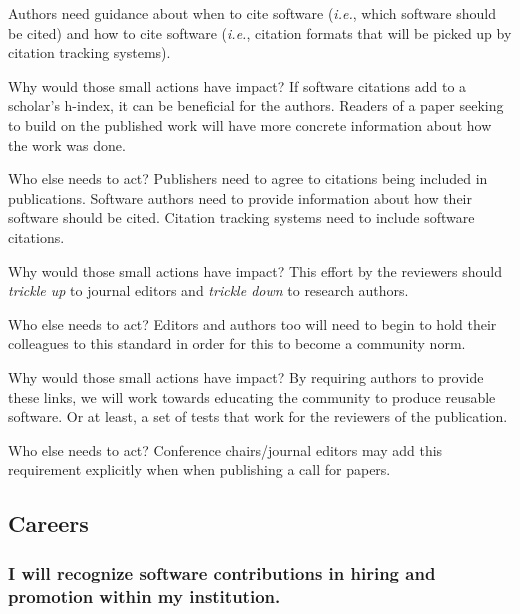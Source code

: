 \documentclass[a4paper,UKenglish]{dagman}
\renewcommand{\paragraph}[1]{\subsubsection*{#1}\xspace}
\newcommand{\ie}{\emph{i.e.},\xspace}
\newcommand{\etc}{\emph{etc.}\xspace}
\begin{document}
Authors need guidance about when to cite software (\ie which software should be cited) and how to cite software (\ie citation formats that will be picked up by citation tracking systems). 

Why would those small actions have impact? If software citations add to a scholar's h-index, it can be beneficial for the authors. Readers of a paper seeking to build on the published work will have more concrete information about how the work was done. 

Who else needs to act? Publishers need to agree to citations being included in publications. Software authors need to provide information about how their software should be cited. Citation tracking systems need to include software citations. 


Why would those small actions have impact? This effort by the reviewers should \emph{trickle up} to journal editors and \emph{trickle down} to research authors.

Who else needs to act? Editors and authors too will need to begin to hold their colleagues to this standard in order for this to become a community norm.

Why would those small actions have impact? By requiring authors to provide these links, we will work towards educating the community to produce reusable software. Or at least, a set of tests that work for the reviewers of the publication. 

Who else needs to act? Conference chairs/journal editors may add this requirement explicitly when when publishing a call for papers. 


\subsection{Careers}


\paragraph{I will recognize software contributions in hiring and promotion within my institution.}
\end{document}
